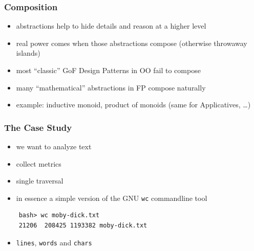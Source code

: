 \documentclass[aspectratio=169]{beamer}
\begin{document}
\begin{frame}
  \frametitle{Composition}
  \begin{itemize}
  \item abstractions help to hide details and reason at a higher level
  \item real power comes when those abstractions compose (otherwise throwaway islands)
  \item most ``classic'' GoF Design Patterns in OO fail to compose
  \item many ``mathematical'' abstractions in FP compose naturally
  \item example: inductive monoid, product of monoids (same for Applicatives, \ldots{})
  \end{itemize}
\end{frame}

\begin{frame}[fragile]
  \frametitle{The Case Study}
  \begin{itemize}
  \item we want to analyze text
  \item collect metrics
  \item single traversal
  \item in essence a simple version of the GNU \texttt{wc} commandline tool
  \end{itemize}
  \begin{verbatim}
    bash> wc moby-dick.txt
    21206  208425 1193382 moby-dick.txt
  \end{verbatim}
  \begin{itemize}
  \item \texttt{lines}, \texttt{words} and \texttt{chars}
  \end{itemize}
\end{frame}
\end{document}
